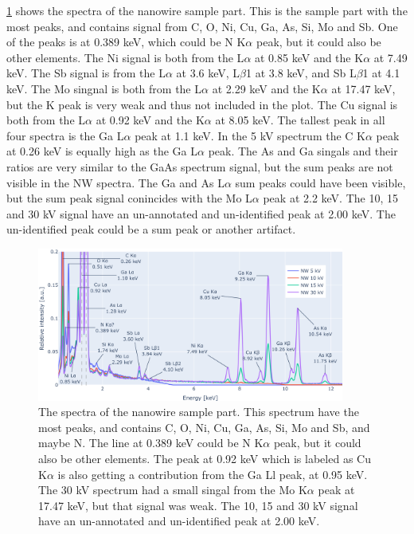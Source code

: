 \cref{fig:results:Spectra_NW} shows the spectra of the nanowire sample part.
This is the sample part with the most peaks, and contains signal from C, O, Ni, Cu, Ga, As, Si, Mo and Sb.
One of the peaks is at 0.389 keV, which could be N K$\alpha$ peak, but it could also be other elements. %
The Ni signal is both from the L$\alpha$ at 0.85 keV and the K$\alpha$ at 7.49 keV.
The Sb signal is from the L$\alpha$ at 3.6 keV, L$\beta$1 at 3.8 keV, and Sb L$\beta$1 at 4.1 keV. %
The Mo singnal is both from the L$\alpha$ at 2.29 keV and the K$\alpha$ at 17.47 keV, but the K peak is very weak and thus not included in the plot.
The Cu signal is both from the L$\alpha$ at 0.92 keV and the K$\alpha$ at 8.05 keV.
The tallest peak in all four spectra is the Ga L$\alpha$ peak at 1.1 keV.
In the 5 kV spectrum the C K$\alpha$ peak at 0.26 keV is equally high as the Ga L$\alpha$ peak.
The As and Ga singals and their ratios are very similar to the GaAs spectrum signal, but the sum peaks are not visible in the NW spectra.
The Ga and As L$\alpha$ sum peaks could have been visible, but the sum peak signal conincides with the Mo L$\alpha$ peak at 2.2 keV. %
The 10, 15 and 30 kV signal have an un-annotated and un-identified peak at 2.00 keV.
The un-identified peak could be a sum peak or another artifact.

\begin{figure}[h]
    \centering
    \includegraphics[width=0.90\textwidth]{figures/each_spectra_not_on_github/NW_everything.png}
    \caption{
        The spectra of the nanowire sample part.
        This spectrum have the most peaks, and contains  C, O, Ni, Cu, Ga, As, Si, Mo and Sb, and maybe N.
        The line at 0.389 keV could be N K$\alpha$ peak, but it could also be other elements. %
        The peak at 0.92 keV which is labeled as Cu K$\alpha$ is also getting a contribution from the Ga Ll peak, at 0.95 keV. %
        The 30 kV spectrum had a small singal from the Mo K$\alpha$ peak at 17.47 keV, but that signal was weak.
        The 10, 15 and 30 kV signal have an un-annotated and un-identified peak at 2.00 keV. %
    }
    \label{fig:results:Spectra_NW}
\end{figure}

